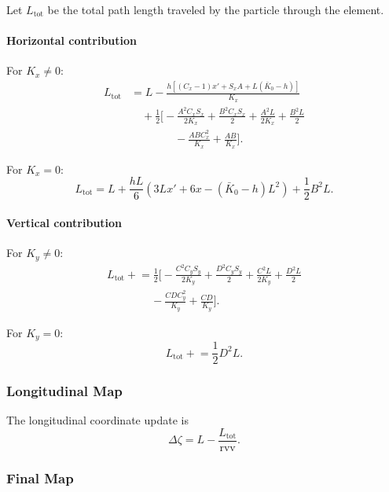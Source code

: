 Let $L_{\text{tot}}$ be the total path length traveled by the particle through the element.

\paragraph{Horizontal contribution}

For $K_x\neq 0$:
\begin{align}
L_{\text{tot}} &= L
- \frac{h\left[(C_x-1)x' + S_x A + L(\bar{K}_0-h)\right]}{K_x} \nonumber\\
&\quad + \frac{1}{2}\Bigg[
- \frac{A^2 C_x S_x}{2K_x}
+ \frac{B^2 C_x S_x}{2}
+ \frac{A^2 L}{2K_x}
+ \frac{B^2 L}{2} \nonumber\\
&\qquad\qquad
- \frac{A B C_x^2}{K_x}
+ \frac{A B}{K_x}
\Bigg].
\end{align}

For $K_x=0$:
\begin{equation}
L_{\text{tot}} =
L
+ \frac{hL}{6}\left(3Lx' + 6x - (\bar{K}_0-h)L^2\right)
+ \frac{1}{2}B^2 L .
\end{equation}

\paragraph{Vertical contribution}

For $K_y\neq 0$:
\begin{align}
L_{\text{tot}} \mathrel{+}= \frac{1}{2}\Bigg[
- \frac{C^2 C_y S_y}{2K_y}
+ \frac{D^2 C_y S_y}{2}
+ \frac{C^2 L}{2K_y}
+ \frac{D^2 L}{2} \nonumber\\
\qquad\qquad
- \frac{C D C_y^2}{K_y}
+ \frac{C D}{K_y}
\Bigg].
\end{align}

For $K_y=0$:
\begin{equation}
L_{\text{tot}} \mathrel{+}= \frac{1}{2}D^2 L .
\end{equation}

\subsubsection*{Longitudinal Map}

The longitudinal coordinate update is
\begin{equation}
\Delta\zeta = L - \frac{L_{\text{tot}}}{\mathrm{rvv}} .
\end{equation}

\subsubsection*{Final Map}

